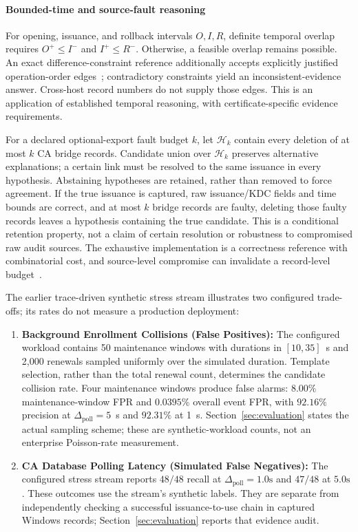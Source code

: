 \paragraph{Bounded-time and source-fault reasoning}
For opening, issuance, and rollback intervals $O,I,R$, definite temporal overlap requires $O^{+}\le I^{-}$ and $I^{+}\le R^{-}$. Otherwise, a feasible overlap remains possible. An exact difference-constraint reference additionally accepts explicitly justified operation-order edges~\cite{dechter1991temporal,amarilli2017order}; contradictory constraints yield an inconsistent-evidence answer. Cross-host record numbers do not supply those edges. This is an application of established temporal reasoning, with certificate-specific evidence requirements.

For a declared optional-export fault budget $k$, let $\mathcal{H}_k$ contain every deletion of at most $k$ CA bridge records. Candidate union over $\mathcal{H}_k$ preserves alternative explanations; a certain link must be resolved to the same issuance in every hypothesis. Abstaining hypotheses are retained, rather than removed to force agreement. If the true issuance is captured, raw issuance/KDC fields and time bounds are correct, and at most $k$ bridge records are faulty, deleting those faulty records leaves a hypothesis containing the true candidate. This is a conditional retention property, not a claim of certain resolution or robustness to compromised raw audit sources. The exhaustive implementation is a correctness reference with combinatorial cost, and source-level compromise can invalidate a record-level budget~\cite{elmagarmid2007duplicate,heinzl2026timestamps}.

The earlier trace-driven synthetic stress stream illustrates two configured trade-offs; its rates do not measure a production deployment:
\begin{enumerate}
    \item \textbf{Background Enrollment Collisions (False Positives):} The configured workload contains 50 maintenance windows with durations in $[10,35]$~s and 2,000 renewals sampled uniformly over the simulated duration. Template selection, rather than the total renewal count, determines the candidate collision rate. Four maintenance windows produce false alarms: $8.00\%$ maintenance-window FPR and $0.0395\%$ overall event FPR, with $92.16\%$ precision at $\Delta_{\text{poll}}=5$~s and $92.31\%$ at 1~s. Section~\ref{sec:evaluation} states the actual sampling scheme; these are synthetic-workload counts, not an enterprise Poisson-rate measurement.
    \item \textbf{CA Database Polling Latency (Simulated False Negatives):} The configured stress stream reports $48/48$ recall at $\Delta_{\text{poll}}=1.0\text{s}$ and $47/48$ at $5.0\text{s}$. These outcomes use the stream's synthetic labels. They are separate from independently checking a successful issuance-to-use chain in captured Windows records; Section~\ref{sec:evaluation} reports that evidence audit.
\end{enumerate}

